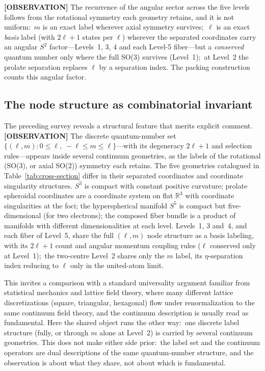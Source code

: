 \documentclass[aps,prl,reprint,amsmath,amssymb]{revtex4-2}
\begin{document}
\medskip

\textbf{[OBSERVATION]} The recurrence of the angular sector across the five levels follows
from the rotational symmetry each geometry retains, and it is not uniform:\ $m$ is an exact label wherever
axial symmetry survives;\ $\ell$ is an exact \emph{basis} label (with
$2\ell+1$ states per $\ell$) wherever the separated coordinates carry an
angular $S^2$ factor---Levels~1, 3, 4 and each Level-5 fiber---but a
\emph{conserved} quantum number only where the full SO(3) survives
(Level~1);\ at Level~2 the prolate separation replaces $\ell$ by a
separation index.  The packing construction counts this angular factor.

\subsection{The node structure as combinatorial invariant}
\label{sec:combinatorial_invariant}

The preceding survey reveals a structural feature that merits explicit
comment.  \textbf{[OBSERVATION]} The discrete quantum-number set
$\{(\ell, m) : 0 \leq \ell, \; -\ell \leq m \leq \ell\}$---with its
degeneracy $2\ell + 1$ and selection rules---appears inside several
continuum geometries, as the labels of the rotational (SO(3), or axial
SO(2)) symmetry each retains.  The five geometries catalogued in
Table~\ref{tab:cross-section} differ in their separated coordinates and
coordinate singularity structures.
$S^3$ is compact with constant positive curvature; prolate spheroidal
coordinates are a coordinate system on flat $\mathbb{R}^3$ with
coordinate singularities at the foci;
the hyperspherical manifold $S^5$ is compact but five-dimensional (for two electrons); the
composed fiber bundle is a product of manifolds with different
dimensionalities at each level.  Levels~1, 3 and~4, and each fiber of
Level~5, share the full $(\ell, m)$ node structure as a basis labeling,
with its $2\ell+1$ count and angular momentum coupling rules ($\ell$
conserved only at Level~1);\ the two-centre Level~2 shares only the $m$
label, its $\eta$-separation index reducing to $\ell$ only in the
united-atom limit.

This invites a comparison with a standard universality argument
familiar from statistical mechanics and lattice field theory, where many
different lattice discretizations (square, triangular, hexagonal) flow
under renormalization to the same continuum field theory, and the
continuum description is usually read as fundamental.  Here the shared
object runs the other way:\ one discrete label structure (fully, or
through $m$ alone at Level~2) is carried by several continuum
geometries.  This does not make either side prior:\ the label set and
the continuum operators are dual descriptions of the same
quantum-number structure, and the observation is about what they share,
not about which is fundamental.
\end{document}
